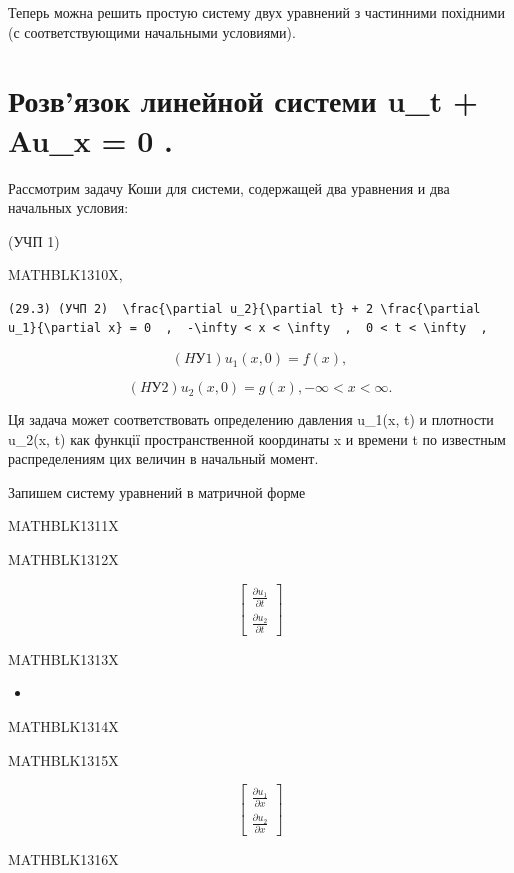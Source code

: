 \documentclass[
  ukrainian,
]{article}
\providecommand{\tightlist}{%
  \setlength{\itemsep}{0pt}\setlength{\parskip}{0pt}}
\begin{document}
Теперь можна решить простую систему двух уравнений з частинними
похідними (с соответствующими начальными условиями).

\section{Розв'язок линейной системи u\_t + Au\_x = 0
.}\label{ux440ux43eux437ux432ux44fux437ux43eux43a-ux43bux438ux43dux435ux439ux43dux43eux439-ux441ux438ux441ux442ux435ux43cux438-u_t-au_x-0-.}

Рассмотрим задачу Коши для системи, содержащей два уравнения и два
начальных условия:

(УЧП 1)

MATHBLK1310X,

\begin{verbatim}
(29.3) (УЧП 2)  \frac{\partial u_2}{\partial t} + 2 \frac{\partial u_1}{\partial x} = 0  ,  -\infty < x < \infty  ,  0 < t < \infty  ,
\end{verbatim}

\[
(HУ 1)  u_1(x, 0) = f(x)  ,
\]

\[
(HУ 2)  u_2(x, 0) = g(x)  ,  -\infty < x < \infty  .
\]

Ця задача может соответствовать определению давления u\_1(x, t) и
плотности u\_2(x, t) как функції пространственной координаты x и времени
t по известным распределениям цих величин в начальный момент.

Запишем систему уравнений в матричной форме

MATHBLK1311X

MATHBLK1312X

\[
\begin{bmatrix} \frac{\partial u_1}{\partial t} \\ \frac{\partial u_2}{\partial t} \end{bmatrix}
\]

MATHBLK1313X

\begin{itemize}
\tightlist
\item
\end{itemize}

MATHBLK1314X

MATHBLK1315X

\[
\begin{bmatrix} \frac{\partial u_1}{\partial x} \\ \frac{\partial u_2}{\partial x} \end{bmatrix}
\]

MATHBLK1316X
\end{document}
